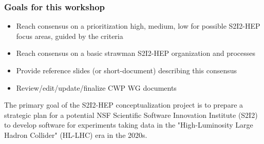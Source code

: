 \begin{frame}
\frametitle{Goals for this workshop}
\begin{itemize}
\item Reach consensus on a prioritization {high, medium, low} for possible S2I2-HEP focus areas, guided by the criteria
\item Reach consensus on a basic strawman S2I2-HEP organization and processes
\item Provide reference slides (or short-document) describing this consensus
\item Review/edit/update/finalize CWP WG documents
\end{itemize}

The primary goal of the S2I2-HEP conceptualization project is to prepare a strategic plan for a potential NSF Scientific Software Innovation Institute (S2I2) to develop software for experiments taking data in the "High-Luminosity Large Hadron Collider" (HL-LHC) era in the 2020s.

\end{frame}


